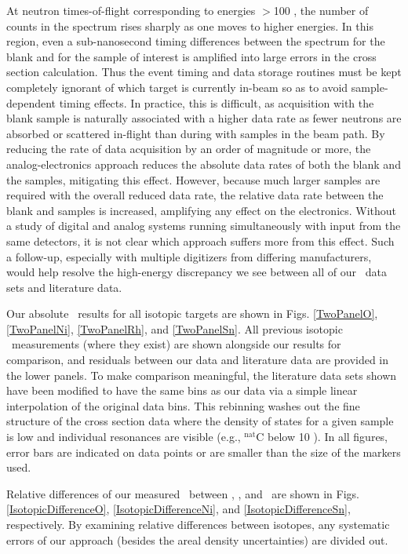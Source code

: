 At neutron times-of-flight corresponding to energies $>$100 \mega\electronvolt, the number of
counts in the spectrum rises sharply as one moves to higher energies. In this
region, even a sub-nanosecond timing differences between the spectrum for the
blank and for the sample of interest is amplified into large errors in the
cross section calculation. Thus the event timing and data
storage routines must be kept completely ignorant of which target is currently
in-beam so as to avoid sample-dependent timing effects. In practice, this is
difficult, as acquisition with the blank sample is naturally associated with
a higher data rate as fewer neutrons are absorbed or scattered in-flight than during
with samples in the beam path. By reducing the rate of data acquisition
by an order of magnitude or more, the analog-electronics approach reduces the
absolute data rates of both the blank and the samples, mitigating this effect.
However, because much larger samples are required with the overall reduced data
rate, the relative data rate between the blank and samples is increased,
amplifying any effect on the electronics. Without a study of digital and analog
systems running simultaneously with input from the same detectors, it is not
clear which approach suffers more from this effect. Such a follow-up, especially
with multiple digitizers from differing manufacturers, would help
resolve the high-energy discrepancy we see between all of our \tot\ data sets
and literature data.

Our absolute \tot\ results for all isotopic targets are shown in Figs.
\ref{TwoPanelO}, \ref{TwoPanelNi}, \ref{TwoPanelRh}, and \ref{TwoPanelSn}.
All previous isotopic \tot\
measurements (where they exist) are shown alongside our results for comparison, and residuals 
between our data and literature data are provided in the lower panels. To make comparison 
meaningful, the literature
data sets shown have been modified to have the same bins as our data via a simple
linear interpolation of the original data bins. This rebinning
washes out the fine structure of the cross section data where the density of states
for a given sample is low and individual resonances are visible
(e.g., $^{\text{nat}}$C below 10 \mega\electronvolt). In all figures, error bars are indicated on data
points or are smaller than the size of the markers used.

Relative differences of our measured \tot\ between \oSixEight, \niEightFour, and
\snTwelveFour\ are shown in Figs. \ref{IsotopicDifferenceO}, \ref{IsotopicDifferenceNi}, 
and \ref{IsotopicDifferenceSn}, respectively. By examining relative differences between
isotopes, any systematic errors of our approach (besides the areal density uncertainties)
are divided out.

